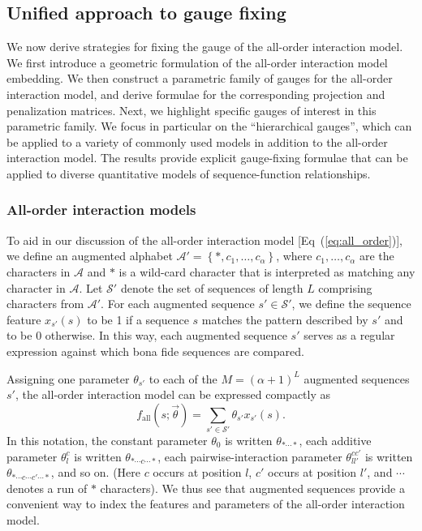 \documentclass[10pt,letterpaper]{article}
\newcommand{\eq}[1]{Eq\ (\ref{#1})}
\newcommand{\set}[1]{\left\{ #1 \right\}}
\begin{document}
\subsection*{Unified approach to gauge fixing}
We now derive strategies for fixing the gauge of the all-order interaction model. We first introduce a geometric formulation of the all-order interaction model embedding. We then construct a parametric family of gauges for the all-order interaction model, and derive formulae for the corresponding projection and penalization matrices. Next, we highlight specific gauges of interest in this parametric family. We focus in particular on the ``hierarchical gauges'', which can be applied to a variety of commonly used models in addition to the all-order interaction model. The results provide explicit gauge-fixing formulae that can be applied to diverse quantitative models of sequence-function relationships.  
 

\subsubsection*{All-order interaction models}

To aid in our discussion of the all-order interaction model [\eq{eq:all_order}], we define an augmented alphabet $\mathcal{A}' = \set{*, c_1, \ldots, c_\alpha}$, where $c_1, \ldots, c_\alpha$ are the characters in $\mathcal{A}$ and $*$ is a wild-card character that is interpreted as matching any character in $\mathcal{A}$. Let $\mathcal{S}'$ denote the set of sequences of length $L$ comprising characters from  $\mathcal{A}'$. For each augmented sequence $s' \in \mathcal{S}'$, we define the sequence feature $x_{s'}(s)$ to be 1 if a sequence $s$ matches the pattern described by $s'$ and to be 0 otherwise. In this way, each augmented sequence $s'$ serves as a regular expression against which bona fide sequences are compared.  

Assigning one parameter $\theta_{s'}$ to each of the $M = (\alpha + 1)^L$ augmented sequences $s'$, the all-order interaction model can be expressed compactly as
\begin{equation}
    f_\textrm{all}(s; \vec{\theta}) = \sum_{s' \in \mathcal{S}'} \theta_{s'} x_{s'}(s). \label{eq:all_interaction_model_short}
\end{equation}
In this notation, the constant parameter $\theta_0$ is written $\theta_{*\cdots*}$, each additive parameter $\theta_l^c$ is written $\theta_{*\cdots c\cdots*}$, each pairwise-interaction parameter $\theta_{ll'}^{cc'}$ is written $\theta_{*\cdots c\cdots c'\cdots *}$, and so on. (Here $c$ occurs at position $l$, $c'$ occurs at position $l'$, and $\cdots$ denotes a run of $ * $ characters). We thus see that augmented sequences provide a convenient way to index the features and parameters of the all-order interaction model.
\end{document}
